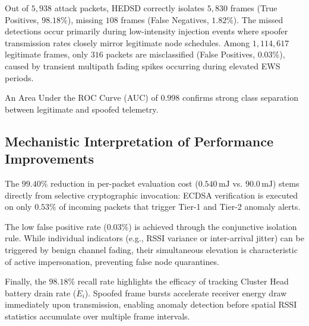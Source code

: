 \documentclass[conference]{IEEEtran}
\begin{document}
\begin{enumerate}
\begin{table}[htbp]
\caption{Confusion Matrix of Proposed HEDSD Spoofing Detection Protocol}
\label{tab_confusion_matrix}
\centering
\small
\renewcommand{\arraystretch}{1.2}
\end{table}

Out of $5,938$ attack packets, HEDSD correctly isolates $5,830$ frames (True Positives, $98.18\%$), missing $108$ frames (False Negatives, $1.82\%$). The missed detections occur primarily during low-intensity injection events where spoofer transmission rates closely mirror legitimate node schedules. Among $1,114,617$ legitimate frames, only $316$ packets are misclassified (False Positives, $0.03\%$), caused by transient multipath fading spikes occurring during elevated EWS periods.

An Area Under the ROC Curve (AUC) of $0.998$ confirms strong class separation between legitimate and spoofed telemetry.

\subsection{Mechanistic Interpretation of Performance Improvements}
The $99.40\%$ reduction in per-packet evaluation cost ($0.540\,\text{mJ}$ vs. $90.0\,\text{mJ}$) stems directly from selective cryptographic invocation: ECDSA verification is executed on only $0.53\%$ of incoming packets that trigger Tier-1 and Tier-2 anomaly alerts.

The low false positive rate ($0.03\%$) is achieved through the conjunctive isolation rule. While individual indicators (e.g., RSSI variance or inter-arrival jitter) can be triggered by benign channel fading, their simultaneous elevation is characteristic of active impersonation, preventing false node quarantines.

Finally, the $98.18\%$ recall rate highlights the efficacy of tracking Cluster Head battery drain rate ($\dot{E}_i$). Spoofed frame bursts accelerate receiver energy draw immediately upon transmission, enabling anomaly detection before spatial RSSI statistics accumulate over multiple frame intervals.


\end{enumerate}
\end{document}
